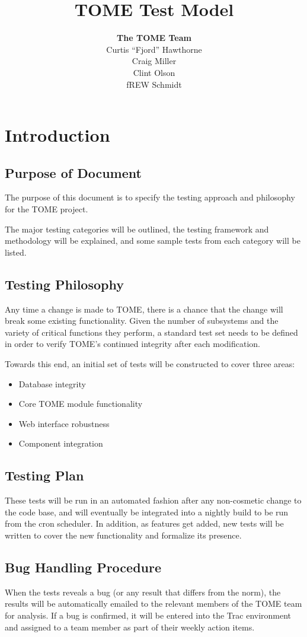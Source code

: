 \documentclass[12pt,titlepage]{article}
\author{\textbf{The TOME Team}\\
Curtis ``Fjord'' Hawthorne \\
Craig Miller\\
Clint Olson\\
fREW Schmidt
}
\title{\textbf{TOME Test Model}}
\begin{document}
\maketitle
\tableofcontents
\newpage
\sloppy
\section{Introduction}
\subsection{Purpose of Document}
The purpose of this document is to specify the testing approach and philosophy for the TOME project.

The major testing categories will be outlined, the testing framework and methodology will be explained, and some sample tests from each category will be listed.

\subsection{Testing Philosophy}
Any time a change is made to TOME, there is a chance that the change will break some existing functionality.  Given the number of subsystems and the variety of critical functions they perform, a standard test set needs to be defined in order to verify TOME's continued integrity after each modification.

Towards this end, an initial set of tests will be constructed to cover three areas:
\begin{itemize}
	\item Database integrity
	\item Core TOME module functionality
	\item Web interface robustness
	\item Component integration
\end{itemize}

\subsection{Testing Plan}
These tests will be run in an automated fashion after any non-cosmetic change to the code base, and will eventually be integrated into a nightly build to be run from the cron scheduler.  In addition, as features get added, new tests will be written to cover the new functionality and formalize its presence.  

\subsection{Bug Handling Procedure}
When the tests reveals a bug (or any result that differs from the norm), the results will be automatically emailed to the relevant members of the TOME team for analysis.  If a bug is confirmed, it will be entered into the Trac environment and assigned to a team member as part of their weekly action items.
\end{document}
